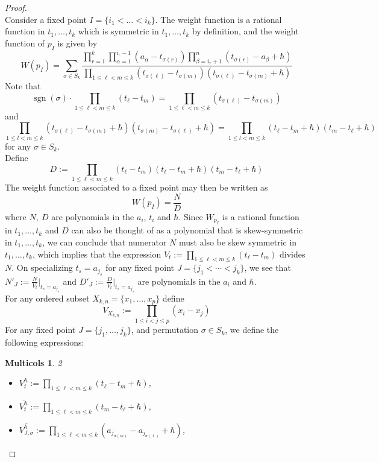 \documentclass[10pt,a4paper]{amsart}
\newtheorem{multicols}{Multicols}
\DeclareMathOperator{\sgn}{sgn}
\begin{document}
\begin{proof}~\\
Consider a fixed point $I=\{i_{1}<\dots<i_{k}\}$. The weight function is a rational function in $t_{1},\dots, t_{k}$ which is symmetric in $t_{1},\dots,t_{k}$ by definition, and the weight function of $p_{I}$ is given by
\[W(p_I)=\sum\limits_{\sigma \in S_k}\dfrac{\prod\limits_{r = 1}^k \prod\limits_{\alpha = 1}^{i_{r} - 1} (a_{\alpha} - t_{\sigma(r)}) \prod\limits_{\beta = i_r + 1}^n (t_{\sigma(r)} - a_{\beta} + \hbar) }{\prod\limits_{1 \leq \ell < m \leq k} (t_{\sigma(\ell)} - t_{\sigma(m)}) (t_{\sigma (\ell)} - t_{\sigma(m)} + \hbar)}\]
Note that 
\[
\sgn(\sigma)\cdot\prod\limits_{1\leq \ell<m\leq k}(t_{\ell}-t_{m})=\prod\limits_{1\leq \ell<m\leq k}(t_{\sigma(\ell)}-t_{\sigma(m)})\]
and
\[
\prod\limits_{1\leq l<m\leq k}(t_{\sigma(\ell)}-t_{\sigma(m)}+\hbar)(t_{\sigma(m)}-t_{\sigma(\ell)}+\hbar)=\prod\limits_{1\leq l<m\leq k}(t_{\ell}-t_{m}+\hbar)(t_{m}-t_{\ell}+\hbar)\] 
for any $\sigma\in S_{k}$.\\
Define \[
D:=\prod\limits_{1\leq\ell<m\leq k}(t_{\ell}-t_{m})(t_{\ell}-t_{m}+\hbar)(t_{m}-t_{\ell}+\hbar)
\]
The weight function associated to a fixed point may then be written as
\[
 W(p_{I})=\frac{N}{D}
\]
where $N,\ D$ are polynomials in the $a_{i}$, $t_{i}$ and $\hbar$. Since $W_{p_{I}}$ is a rational function in $t_{1},\dots, t_{k}$ and $D$ can also be thought of as a polynomial that is skew-symmetric in $t_{1},\dots,t_{k}$, we can conclude that numerator $N$ must also be skew symmetric in $t_{1},\dots,t_{k}$, which implies that the expression $V_{t}:=\prod\limits_{1\leq\ell<m\leq k}(t_{\ell}-t_{m})$ divides $N$. On specializing $t_{s}=a_{j_{s}}$ for any fixed point $J=\{j_{1}< \cdots < j_{k}\}$, we see that $N'_{J}:=\frac{N}{V_{t}}|_{t_{s}=a_{j_{s}}}$ and $D'_{J}:=\frac{D}{V_{t}}|_{t_{s}=a_{j_{s}}}$ are polynomials in the $a_{i}$ and $\hbar$. \\
For any ordered subset $X_{k,n}=\{x_{1},\dots,x_{p}\}$ define
\[V_{X_{k,n}}:=\prod\limits_{1\leq i<j\leq p}(x_{i}-x_{j})\]
For any fixed point $J=\{j_{1},\dots,j_{k}\}$, and permutation $\sigma \in S_k$, we define the following expressions:
\begin{multicols}{2}
\begin{itemize}
\item $V_{t}^{\hbar} := \prod\limits_{1 \leq \ell < m \leq k} (t_{\ell} - t_{m} + \hbar)$,
\item $\overline{V_{t}^{\hbar}} := \prod\limits_{1 \leq \ell < m \leq k} (t_{m} - t_{\ell} + \hbar)$,
\item $\overline{V_{J,\sigma}^{\hbar}} := \prod\limits_{1 \leq \ell < m \leq k} (a_{j_{\sigma(m)}} - a_{j_{\sigma(\ell)}} + \hbar)$,

\end{itemize}
\end{multicols}
\end{proof}
\end{document}
